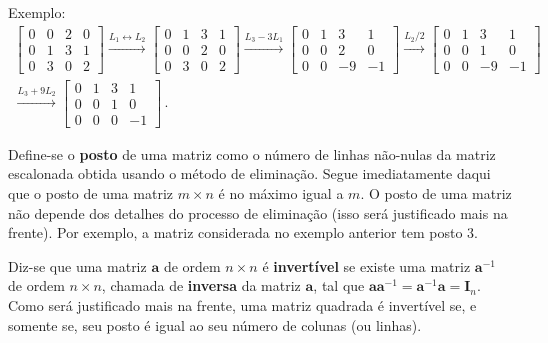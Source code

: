 \documentclass[12pt,a4paper]{report}
\newcommand{\tb}{\textbf}
\newcommand{\mb}{\mathbf}
\begin{document}
Exemplo:
\begin{multline*}
  \begin{bmatrix}
    0&0&2&0\\
    0&1&3&1\\
    0&3&0&2
  \end{bmatrix}\xrightarrow{L_1\leftrightarrow L_2} \begin{bmatrix}
    0&1&3&1\\
    0&0&2&0\\
    0&3&0&2
\end{bmatrix}\xrightarrow{L_3-3L_1} \begin{bmatrix}
  0&1&3&1\\
  0&0&2&0\\
  0&0&-9&-1
\end{bmatrix}\xrightarrow{L_2/2}\begin{bmatrix}
  0&1&3&1\\
  0&0&1&0\\
  0&0&-9&-1
\end{bmatrix}\\
\xrightarrow{L_3+9L_2}\begin{bmatrix}
  0&1&3&1\\
  0&0&1&0\\
  0&0&0&-1
\end{bmatrix}\,.
\end{multline*}

Define-se o \tb{posto} de uma matriz como o número de linhas não-nulas da matriz escalonada obtida usando o método de eliminação. Segue imediatamente daqui que o posto de uma matriz $m\times n$ é no máximo igual a $m$. O posto de uma matriz não depende dos detalhes do processo de eliminação (isso será justificado mais na frente). Por exemplo, a matriz considerada no exemplo anterior tem posto $3$.

Diz-se que uma matriz $\mb a$ de ordem $n\times n$ é \tb{invertível} se existe uma matriz $\mb a^{-1}$ de ordem $n\times n$, chamada de \tb{inversa} da matriz $\mb a$, tal que $\mb a\mb a^{-1}=\mb a^{-1}\mb a=\mb I_n$. Como será justificado mais na frente, uma matriz quadrada é invertível se, e somente se, seu posto é igual ao seu número de colunas (ou linhas).
\end{document}
